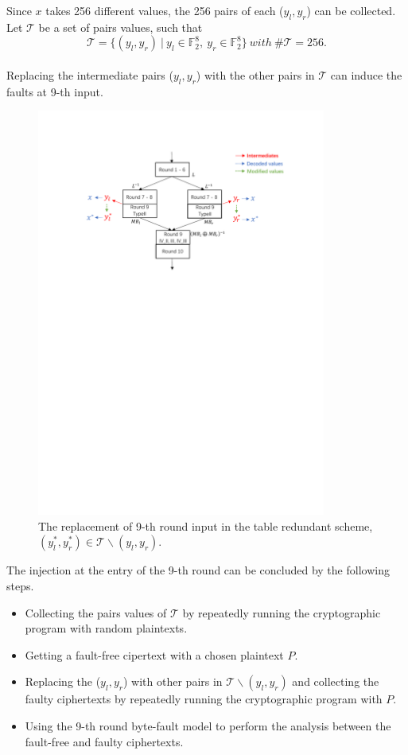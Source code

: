 \documentclass{beamer}
\begin{document}
\frame
{
	Since $x$ takes 256 different values, the 256 pairs of each ($y_{l},y_{r}$) can be collected.
	\\[2ex]
	Let $\mathcal{T}$ be a set of pairs values, such that
	\[\mathcal{T}=\{(y_{l},y_{r})\ |\ y_{l} \in \mathbb{F}_{2}^{8},\ y_{r} \in \mathbb{F}_{2}^{8}\}\ with\ \#\mathcal{T}=256.\]
	\\[2ex]
	Replacing the intermediate pairs ($y_{l},y_{r}$) with the other pairs in $\mathcal{T}$ can induce the faults at 9-th input.
}

\frame
{
	\begin{figure}
		\centering
		\includegraphics[width=9.5cm]{./pics/TRS4.pdf}
		\caption{The replacement of 9-th round input in the table redundant scheme, $(y^{*}_{l},y^{*}_{r})\in\mathcal{T}\backslash(y_{l},y_{r})$.}
	\end{figure}
}

\frame
{
	The injection at the entry of the 9-th round can be concluded by the following steps.
	\begin{itemize}
		\item Collecting the pairs values of $\mathcal{T}$ by repeatedly running the cryptographic program with random plaintexts.
		\item Getting a fault-free cipertext with a chosen plaintext $P$.
		\item Replacing the ($y_{l},y_{r}$) with other pairs in $\mathcal{T}\backslash(y_{l},y_{r})$ and collecting the faulty ciphertexts by repeatedly running the cryptographic program with $P$.
		\item Using the 9-th round byte-fault model to perform the analysis between the fault-free and faulty ciphertexts.
	\end{itemize}
}
\end{document}
